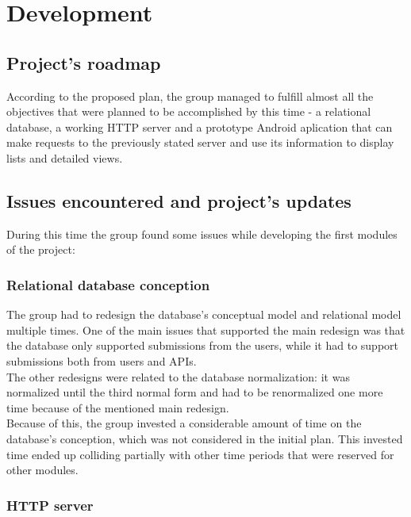 %
%
\chapter{Development}
    
	\section{Project's roadmap}

    According to the proposed plan, the group managed to fulfill almost all the objectives
    that were planned to be accomplished by this time - a relational database, a working HTTP server
    and a prototype Android aplication that can make requests to the previously stated server and 
    use its information to display lists and detailed views.

    \section{Issues encountered and project's updates}

    During this time the group found some issues while developing the first modules of the project:
    
    \subsection{Relational database conception}

    The group had to redesign the database's conceptual model and relational model multiple times.
    One of the main issues that supported the main redesign was that the database 
    only supported submissions from the users, while it had to support submissions both from users and APIs.\\

    The other redesigns were related to the database normalization: it was normalized until the third normal form 
    and had to be renormalized one more time because of the mentioned main redesign.\\ 

    Because of this, the group invested a considerable amount of time on the database's conception, which was not considered
    in the initial plan. This invested time ended up colliding partially with other time periods that were
    reserved for other modules.

    \subsection{HTTP server}

